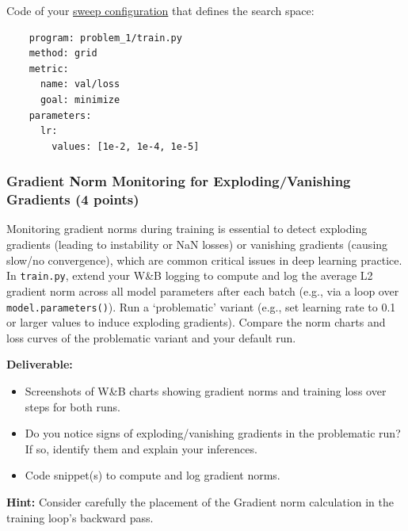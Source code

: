 \documentclass[11pt, oneside]{article}   	%
\begin{document}
\begin{answerbox}
Code of your \href{https://docs.wandb.ai/guides/sweeps/define-sweep-configuration}{sweep configuration} that defines the search space:

\begin{verbatim}
    program: problem_1/train.py
    method: grid 
    metric:
      name: val/loss
      goal: minimize
    parameters:
      lr:
        values: [1e-2, 1e-4, 1e-5]
\end{verbatim}

\end{answerbox}

\subsubsection*{Gradient Norm Monitoring for Exploding/Vanishing Gradients (4 points)}
Monitoring gradient norms during training is essential to detect exploding gradients (leading to instability or NaN losses) or vanishing gradients (causing slow/no convergence), which are common critical issues in deep learning practice. In \texttt{train.py}, extend your W\&B logging to compute and log the average L2 gradient norm across all model parameters after each batch (e.g., via a loop over \texttt{model.parameters()}). Run a `problematic' variant (e.g., set learning rate to 0.1 or larger values to induce exploding gradients). Compare the norm charts and loss curves of the problematic variant and your default run.

\noindent\textbf{Deliverable:}
\begin{itemize}
\item Screenshots of W\&B charts showing gradient norms and training loss over steps for both runs.
\item Do you notice signs of exploding/vanishing gradients in the problematic run? If so, identify them and explain your inferences. 
\item Code snippet(s) to compute and log gradient norms.
\end{itemize}
\textbf{Hint:} Consider carefully the placement of the Gradient norm calculation in the training loop's backward pass.
\end{document}
